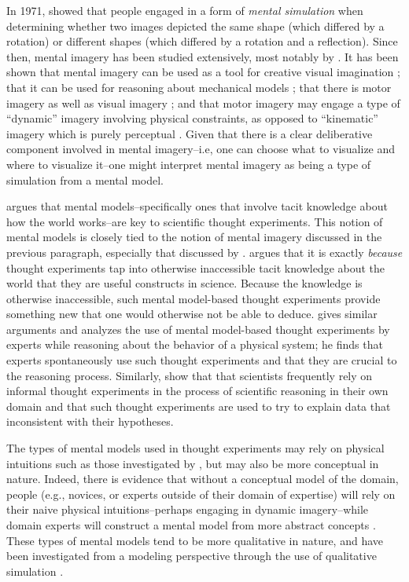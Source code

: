 \documentclass[12pt]{article}
\begin{document}
In 1971, \cite{Shepard1971} showed that people engaged in a form of \textit{mental simulation} when determining whether two images depicted the same shape (which differed by a rotation) or different shapes (which differed by a rotation and a reflection). Since then, mental imagery has been studied extensively, most notably by \cite{Kosslyn2006}. It has been shown that mental imagery can be used as a tool for creative visual imagination \citep{Finke1988}; that it can be used for reasoning about mechanical models \citep{Hegarty2004}; that there is motor imagery as well as visual imagery \citep{Parsons1994,Flusberg2011}; and that motor imagery may engage a type of ``dynamic'' imagery involving physical constraints, as opposed to ``kinematic'' imagery which is purely perceptual \citep{Schwartz1999a}. Given that there is a clear deliberative component involved in mental imagery--i.e, one can choose what to visualize and where to visualize it--one might interpret mental imagery as being a type of simulation from a mental model.

\cite{Gendler1998} argues that mental models--specifically ones that involve tacit knowledge about how the world works--are key to scientific thought experiments. This notion of mental models is closely tied to the notion of mental imagery discussed in the previous paragraph, especially that discussed by \cite{Schwartz1999a}. \cite{Gendler1998} argues that it is exactly \textit{because} thought experiments tap into otherwise inaccessible tacit knowledge about the world that they are useful constructs in science. Because the knowledge is otherwise inaccessible, such mental model-based thought experiments provide something new that one would otherwise not be able to deduce. \cite{Clement2009} gives similar arguments and analyzes the use of mental model-based thought experiments by experts while reasoning about the behavior of a physical system; he finds that experts spontaneously use such thought experiments and that they are crucial to the reasoning process. Similarly, \cite{Trickett2007} show that that scientists frequently rely on informal thought experiments in the process of scientific reasoning in their own domain and that such thought experiments are used to try to explain data that inconsistent with their hypotheses.

The types of mental models used in thought experiments may rely on physical intuitions such as those investigated by \cite{Schwartz1999a}, but may also be more conceptual in nature. Indeed, there is evidence that without a conceptual model of the domain, people (e.g., novices, or experts outside of their domain of expertise) will rely on their naive physical intuitions--perhaps engaging in dynamic imagery--while domain experts will construct a mental model from more abstract concepts \citep{Gentner1983}. These types of mental models tend to be more qualitative in nature, and have been investigated from a modeling perspective through the use of qualitative simulation \citep{Kuipers1986,Forbus2011}.
\end{document}
